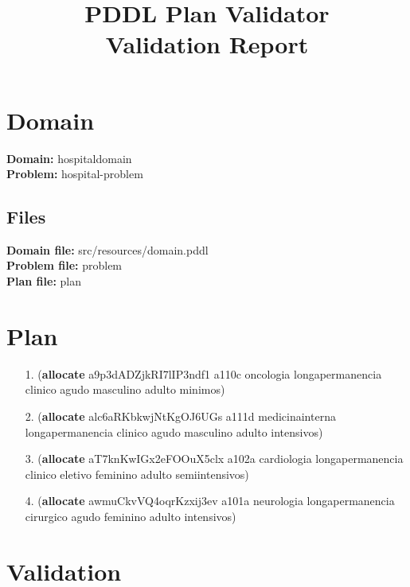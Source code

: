 \documentclass{article}
\title{\textbf{PDDL Plan Validator}\\Validation Report}
\date{} %
\begin{document}
\maketitle

\section{Domain}
\textbf{Domain:}  hospitaldomain\\
\textbf{Problem:} hospital-problem

\subsection{Files}
\textbf{Domain file:}  src/resources/domain.pddl \\
\textbf{Problem file:} problem\\
\textbf{Plan file:}    plan

\section{Plan}

\begin{itemize}
    \item[1.] (\textbf{allocate} a9p3dADZjkRI7lIP3ndf1 a110c oncologia longapermanencia clinico agudo masculino adulto minimos)
    \item[2.] (\textbf{allocate} alc6aRKbkwjNtKgOJ6UGs a111d medicinainterna longapermanencia clinico agudo masculino adulto intensivos)
    \item[3.] (\textbf{allocate} aT7knKwIGx2eFOOuX5clx a102a cardiologia longapermanencia clinico eletivo feminino adulto semiintensivos)
    \item[4.] (\textbf{allocate} awmuCkvVQ4oqrKzxij3ev a101a neurologia longapermanencia cirurgico agudo feminino adulto intensivos)
\end{itemize}

\section{Validation}
\end{document}
